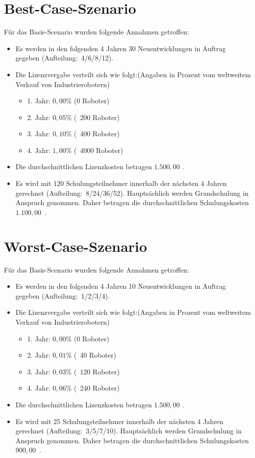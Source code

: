 \section{Best-Case-Szenario}
Für das Basis-Scenario wurden folgende Annahmen getroffen:
\begin{itemize}
	\item Es werden in den folgenden 4 Jahren 30 Neuentwicklungen in Auftrag gegeben (Aufteilung:~4/6/8/12).
	\item Die Lizenzvergabe verteilt sich wie folgt:\newline (Angaben in Prozent vom weltweitem Verkauf von Industrierobotern)
	\begin{itemize}
		\item 1. Jahr: $0,00$\% (0 Roboter)
		\item 2. Jahr: $0,05$\% (~200 Roboter)
		\item 3. Jahr: $0,10$\% (~400 Roboter)
		\item 4. Jahr: $1,00$\% (~4000 Roboter)
	\end{itemize}
	\item Die durchschnittlichen Lizenzkosten betragen $1.500,00$ \officialeuro.
	\item Es wird mit 120 Schulungsteilnehmer innerhalb der nächsten 4 Jahren gerechnet (Aufteilung:~8/24/36/52). Hauptsächlich werden Grundschulung in Anspruch genommen. Daher betragen die durchschnittlichen Schulungskosten $1.100,00$~\officialeuro.
\end{itemize}

\section{Worst-Case-Szenario}
Für das Basis-Scenario wurden folgende Annahmen getroffen:
\begin{itemize}
	\item Es werden in den folgenden 4 Jahren 10 Neuentwicklungen in Auftrag gegeben (Aufteilung:~1/2/3/4).
	\item Die Lizenzvergabe verteilt sich wie folgt:\newline (Angaben in Prozent vom weltweitem Verkauf von Industrierobotern)
	\begin{itemize}
		\item 1. Jahr: $0,00$\% (0 Roboter)
		\item 2. Jahr: $0,01$\% (~40 Roboter)
		\item 3. Jahr: $0,03$\% (~120 Roboter)
		\item 4. Jahr: $0,06$\% (~240 Roboter)
	\end{itemize}
	\item Die durchschnittlichen Lizenzkosten betragen $1.500,00$ \officialeuro.
	\item Es wird mit 25 Schulungsteilnehmer innerhalb der nächsten 4 Jahren gerechnet (Aufteilung:~3/5/7/10). Hauptsächlich werden Grundschulung in Anspruch genommen. Daher betragen die durchschnittlichen Schulungskosten $900,00$~\officialeuro.
\end{itemize}